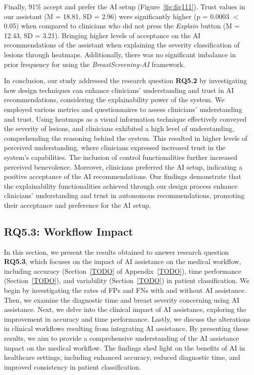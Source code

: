 Finally, 91\% accept and prefer the \ac{AI} setup (Figure~\ref{fig:fig111}).
Trust values in our assistant (M = 18.81, SD = 2.96) were significantly higher (p = 0.0003 $<$ 0.05) when compared to clinicians who did not press the {\it Explain} button (M = 12.43, SD = 3.21).
Bringing higher levels of acceptance on the \ac{AI} recommendations of the assistant when explaining the severity classification of lesions through heatmaps.
Additionally, there was no significant imbalance in prior frequency for using the {\it BreastScreening-AI} framework.

In conclusion, our study addressed the research question {\bf RQ5.2} by investigating how design techniques can enhance clinicians' understanding and trust in \ac{AI} recommendations, considering the explainability power of the system.
We employed various metrics and questionnaires to assess clinicians' understanding and trust.
Using heatmaps as a visual information technique effectively conveyed the severity of lesions, and clinicians exhibited a high level of understanding, comprehending the reasoning behind the system.
This resulted in higher levels of perceived understanding, where clinicians expressed increased trust in the system's capabilities.
The inclusion of control functionalities further increased perceived benevolence.
Moreover, clinicians preferred the \ac{AI} setup, indicating a positive acceptance of the \ac{AI} recommendations.
Our findings demonstrate that the explainability functionalities achieved through our design process enhance clinicians' understanding and trust in autonomous recommendations, promoting their acceptance and preference for the \ac{AI} setup.

\subsection{RQ5.3: Workflow Impact}
\label{sec:chap005006003}

In this section, we present the results obtained to answer research question {\bf RQ5.3}, which focuses on the impact of \ac{AI} assistance on the medical workflow, including accuracy (Section~\ref{TODO} of Appendix~\ref{TODO}), time performance (Section~\ref{TODO}), and variability (Section~\ref{TODO}) in patient classification.
We begin by investigating the rates of \acp{FP} and \acp{FN} with and without \ac{AI} assistance.
Then, we examine the diagnostic time and breast severity concerning using \ac{AI} assistance.
Next, we delve into the clinical impact of \ac{AI} assistance, exploring the improvement in accuracy and time performance.
Lastly, we discuss the alterations in clinical workflows resulting from integrating \ac{AI} assistance.
By presenting these results, we aim to provide a comprehensive understanding of the \ac{AI} assistance impact on the medical workflow.
The findings shed light on the benefits of \ac{AI} in healthcare settings, including enhanced accuracy, reduced diagnostic time, and improved consistency in patient classification.

